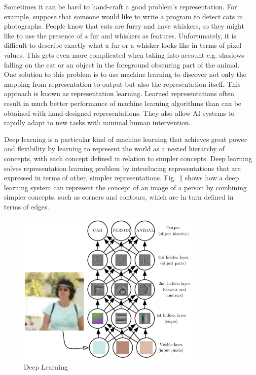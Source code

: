 Sometimes it can be hard to hand-craft a good problem's representation. For example, suppose that someone would like to write a program to detect cats in photographs. People know that cats are furry and have whiskers, so they might like to use the presence of a fur and whiskers as features. Unfortunately, it is difficult to describe exactly what a fur or a whisker looks like in terms of pixel values. This gets even more complicated when taking into account e.g. shadows falling on the cat or an object in the foreground obscuring part of the animal.
One solution to this problem is to use machine learning to discover not only the mapping from representation to output but also the representation itself. This approach is known as representation learning. Learned representations often result in much better performance of machine learning algorithms than can be obtained with hand-designed representations. They also allow AI systems to rapidly adapt to new tasks with minimal human intervention.

Deep learning is a particular kind of machine learning that achieves great power and flexibility by learning to represent the world as a nested hierarchy of concepts, with each concept defined in relation to simpler concepts. Deep learning solves representation learning problem by introducing representations that are expressed in terms of other, simpler representations. Fig.~\ref{Fig.DL} shows how a deep learning system can represent the concept of an image of a person by combining simpler concepts, such as corners and contours, which are in turn defined in terms of edges.

\begin{figure}[H]
\includegraphics[width=0.8\textwidth,keepaspectratio]{figures/DL.png}
\caption[Deep Learning]{Deep Learning \protect\cite{Book.DeepLearning}}
\label{Fig.DL}
\end{figure}

